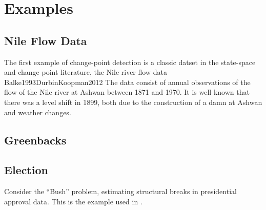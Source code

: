 \documentclass{article}
\begin{document}
\section{Examples}
\label{sec:examples}

\subsection{Nile Flow Data}
\label{sec:nile}

The first example of change-point detection is a classic datset in the state-space and change point literature, the Nile river flow data \textcite{Cobb1978}{Balke1993}{DurbinKoopman2012}
The data consist of annual observations of the flow of the Nile river at Ashwan between 1871 and 1970. 
It is well known that there was a level shift in 1899, both due to the construction of a damn at Ashwan and weather changes.

\subsection{Greenbacks}
\label{sec:greenbacks-graybacks}

\subsection{Election}
\label{sec:election}

Consider the ``Bush'' problem, estimating structural breaks in
presidential approval data. This is the example used in
\textcite{RatkovicEng2010}.


\printbibliography{}
\end{document}
